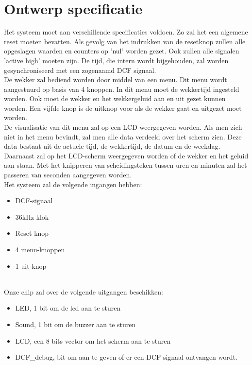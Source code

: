 \chapter{Ontwerp specificatie}
Het systeem moet aan verschillende specificaties voldoen. Zo zal het een algemene reset moeten bevatten. Als gevolg van het indrukken van de resetknop zullen alle opgeslagen waarden en counters op 'nul' worden gezet. Ook zullen alle signalen 'active high' moeten zijn. De tijd, die intern wordt bijgehouden, zal worden gesynchroniseerd met een zogenaamd DCF signaal.\\
De wekker zal bediend worden door middel van een menu. Dit menu wordt aangestuurd op basis van 4 knoppen. In dit menu moet de wekkertijd ingesteld worden. Ook moet de wekker en het wekkergeluid aan en uit gezet kunnen worden. Een vijfde knop is de uitknop voor als de wekker gaat en uitgezet moet worden.\\
De visualisatie van dit menu zal op een LCD weergegeven worden. Als men zich niet in het menu bevindt, zal men alle data verdeeld over het scherm zien. Deze data bestaat uit de actuele tijd, de wekkertijd, de datum en de weekdag. Daarnaast zal op het LCD-scherm weergegeven worden of de wekker en het geluid aan staan. Met het knipperen van scheidingsteken tussen uren en minuten zal het passeren van seconden aangegeven worden.\\
Het systeem zal de volgende ingangen hebben:
\begin{itemize}[nolistsep]
\item	DCF-signaal
\item	36kHz klok
\item	Reset-knop
\item	4 menu-knoppen
\item 1 uit-knop
\end{itemize}

\noindent
\\
Onze chip zal over de volgende uitgangen beschikken:
\begin{itemize}[nolistsep]
\item	LED, 1 bit om de led aan te sturen
\item	Sound, 1 bit om de buzzer aan te sturen
\item	LCD, een 8 bits vector om het scherm aan te sturen
\item	DCF\_debug, bit om aan te geven of er een DCF-signaal ontvangen wordt.
\end{itemize}
